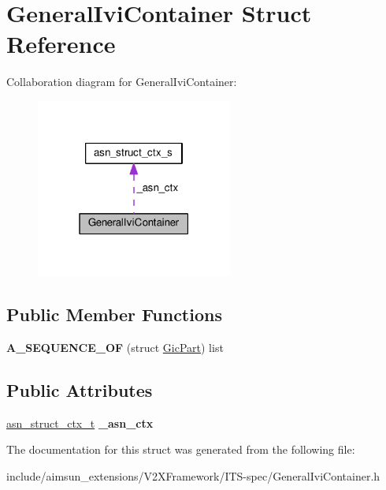 \hypertarget{structGeneralIviContainer}{}\section{General\+Ivi\+Container Struct Reference}
\label{structGeneralIviContainer}


Collaboration diagram for General\+Ivi\+Container\+:\nopagebreak
\begin{figure}[H]
\begin{center}
\leavevmode
\includegraphics[width=183pt]{structGeneralIviContainer__coll__graph}
\end{center}
\end{figure}
\subsection*{Public Member Functions}
\begin{DoxyCompactItemize}
\item 
{\bfseries A\+\_\+\+S\+E\+Q\+U\+E\+N\+C\+E\+\_\+\+OF} (struct \hyperlink{structGicPart}{Gic\+Part}) list\hypertarget{structGeneralIviContainer_a21d39a4016885d6dec71e6ec0228d18b}{}\label{structGeneralIviContainer_a21d39a4016885d6dec71e6ec0228d18b}

\end{DoxyCompactItemize}
\subsection*{Public Attributes}
\begin{DoxyCompactItemize}
\item 
\hyperlink{structasn__struct__ctx__s}{asn\+\_\+struct\+\_\+ctx\+\_\+t} {\bfseries \+\_\+asn\+\_\+ctx}\hypertarget{structGeneralIviContainer_ab4c2630d5b49903f0971d4fde45a4d41}{}\label{structGeneralIviContainer_ab4c2630d5b49903f0971d4fde45a4d41}

\end{DoxyCompactItemize}


The documentation for this struct was generated from the following file\+:\begin{DoxyCompactItemize}
\item 
include/aimsun\+\_\+extensions/\+V2\+X\+Framework/\+I\+T\+S-\/spec/General\+Ivi\+Container.\+h\end{DoxyCompactItemize}
